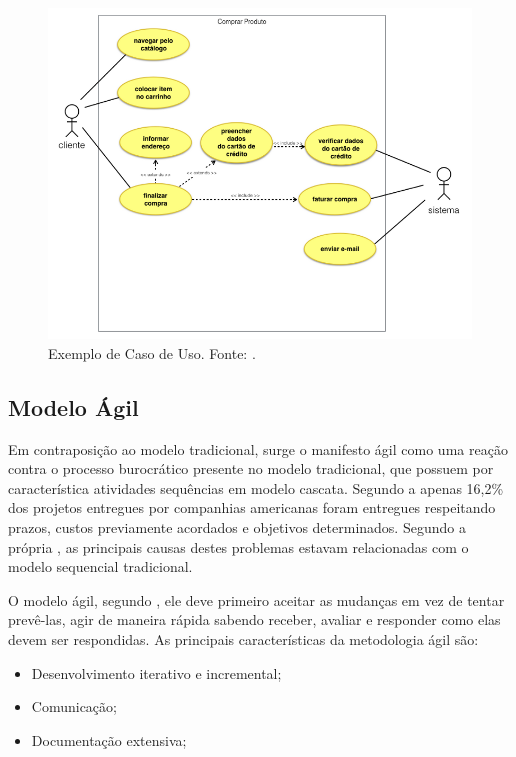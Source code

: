 \begin{figure}[H]
	\centering
	\includegraphics[width=1.0\textwidth]{figuras/caso_de_uso_exemplo.png}
	\caption{Exemplo de Caso de Uso. Fonte: .}
	\label{img:exemplo_caso_de_uso}
\end{figure}

\subsection{Modelo Ágil}
\label{sec:modelo_agil}

Em contraposição ao modelo tradicional, surge o manifesto ágil como uma reação contra o processo burocrático presente no modelo tradicional, que possuem por característica atividades sequências em modelo cascata. Segundo a  apenas 16,2\% dos projetos entregues por companhias americanas foram entregues respeitando prazos, custos previamente acordados e objetivos determinados. Segundo a própria , as principais causas destes problemas estavam relacionadas com o modelo sequencial tradicional.

O modelo ágil, segundo , ele deve primeiro aceitar as mudanças em vez de tentar prevê-las, agir de maneira rápida sabendo receber, avaliar e responder como elas devem ser respondidas. As principais características da metodologia ágil são:

\begin{itemize}
	\item Desenvolvimento iterativo e incremental;
	\item Comunicação;
	\item Documentação extensiva; 
\end{itemize}

